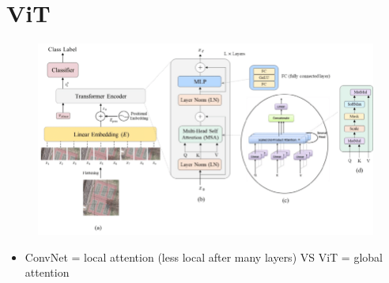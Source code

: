 \documentclass{article}
\theoremstyle{plain}%
\theoremstyle{definition}
\theoremstyle{remark}
\begin{document}
\section{ViT}
\begin{figure}[H]
    \centering
    \includegraphics*[width=.8\textwidth]{figs/The-Vision-Transformer-architecture-a-the-main-architecture-of-the-model-b-the.png}
\end{figure}
\begin{itemize}
    \item ConvNet = local attention (less local after many layers) VS ViT = global attention 
\end{itemize}
\end{document}
